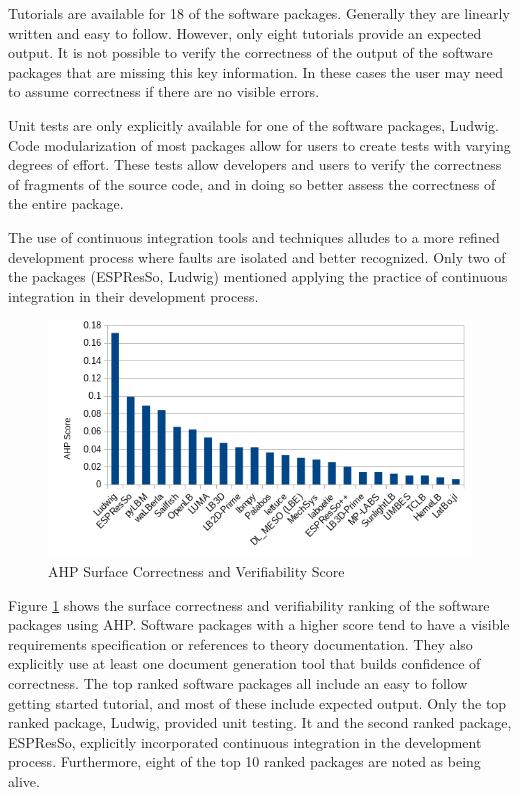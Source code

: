 \documentclass[12pt, notitlepage]{article}
\begin{document}
Tutorials are available for 18 of the software packages. Generally they are linearly written and easy to follow. However, only eight tutorials provide an expected output. It is not possible to verify the correctness of the output of the software packages that are missing this key information. In these cases the user may need to assume correctness if there are no visible errors.

Unit tests are only explicitly available for one of the software packages, Ludwig. Code modularization of most packages allow for users to create tests with varying degrees of effort. These tests allow developers and users to verify the correctness of fragments of the source code, and in doing so better assess the correctness of the entire package.

The use of continuous integration tools and techniques alludes to a more refined development process where faults are isolated and better recognized. Only two of the packages (ESPResSo, Ludwig) mentioned applying the practice of continuous integration in their development process. 

\begin{figure}[h!]
	\begin{center}
		\includegraphics[width=1.0\textwidth]{correctnessverifiability_chart}
		\caption{AHP Surface Correctness and Verifiability Score}
		\label{Fig_CorrectnessVerifiability}
	\end{center}
\end{figure}

Figure \ref{Fig_CorrectnessVerifiability} shows the surface correctness and verifiability ranking of the software packages using AHP. Software packages with a higher score tend to have a visible requirements specification or references to theory documentation. They also explicitly use at least one document generation tool that builds confidence of correctness. The top ranked software packages all include an easy to follow getting started tutorial, and most of these include expected output. Only the top ranked package, Ludwig, provided unit testing. It and the second ranked package, ESPResSo, explicitly incorporated continuous integration in the development process. Furthermore, eight of the top 10 ranked packages are noted as being alive.
\end{document}
